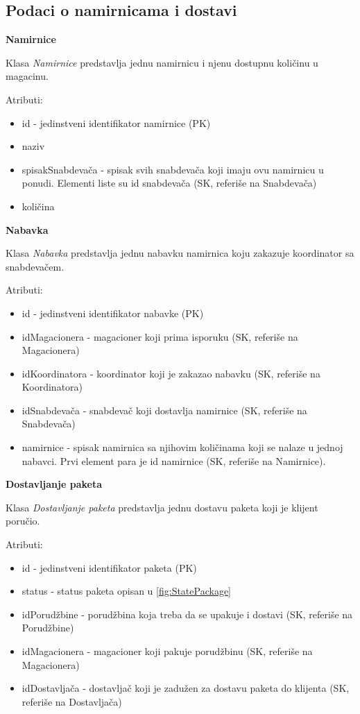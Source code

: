 \subsection{Podaci o namirnicama i dostavi}

\textbf{\large Namirnice}
\vspace{0.3cm}

Klasa \textit{Namirnice} predstavlja jednu namirnicu i njenu dostupnu količinu u magacinu.

Atributi:
\begin{itemize}
    \item id - jedinstveni identifikator namirnice (PK)
    \item naziv 
    \item spisakSnabdevača - spisak svih snabdevača koji imaju ovu namirnicu u ponudi. Elementi liste su id snabdevača (SK, referiše na Snabdevača)
    \item količina
\end{itemize}

\textbf{\large Nabavka}
\vspace{0.3cm}

Klasa \textit{Nabavka} predstavlja jednu nabavku namirnica koju zakazuje koordinator sa snabdevačem.

Atributi:
\begin{itemize}
    \item id - jedinstveni identifikator nabavke (PK)
    \item idMagacionera - magacioner koji prima isporuku (SK, referiše na Magacionera)
    \item idKoordinatora - koordinator koji je zakazao nabavku (SK, referiše na Koordinatora)
    \item idSnabdevača - snabdevač koji dostavlja namirnice (SK, referiše na Snabdevača) 
    \item namirnice - spisak namirnica sa njihovim količinama koji se nalaze u jednoj nabavci. Prvi element para je id namirnice  (SK, referiše na Namirnice).
\end{itemize}

\textbf{\large Dostavljanje paketa}
\vspace{0.3cm}

Klasa \textit{Dostavljanje paketa} predstavlja jednu dostavu paketa  koji je klijent poručio.

Atributi:
\begin{itemize}
    \item id - jedinstveni identifikator paketa (PK)
    \item status - status paketa opisan u \ref{fig:StatePackage}
    \item idPorudžbine - porudžbina koja treba da se upakuje i dostavi (SK, referiše na Porudžbine)
    \item idMagacionera - magacioner koji pakuje porudžbinu (SK, referiše na Magacionera)
    \item idDostavljača - dostavljač koji je zadužen za dostavu paketa do klijenta (SK, referiše na Dostavljača)
\end{itemize}
